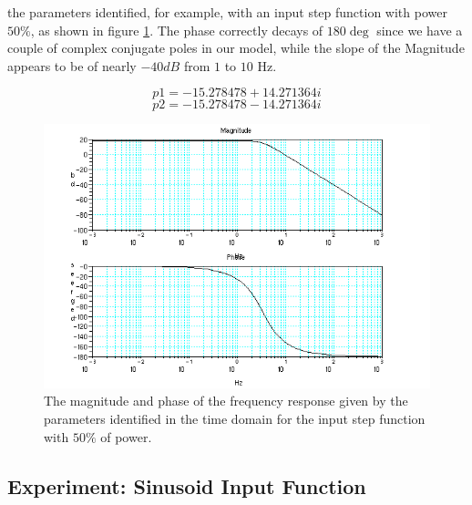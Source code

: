 the parameters identified, for example, with an input step function with power $50\%$, as shown in figure \ref{fig:bode_plot_sos}. The phase correctly decays of $180\deg$ since we have a couple of complex conjugate poles in our model, while the slope of the Magnitude appears to be of nearly $-40 dB$ from $1$ to $10$ Hz. 

\[
p1  = - 15.278478 + 14.271364i  
\]
\[
p2  = - 15.278478 - 14.271364i
\]

\begin{figure}[htbp]
\center
  \includegraphics[scale=0.65]{FIGURES_1/BODE_PLOT.png}
  \caption[Bode Plot]{The magnitude and phase of the frequency response given by the parameters identified in the time domain for the input step function with $50\%$ of power.}
  \label{fig:bode_plot_sos}
\end{figure}




\subsection{Experiment: Sinusoid Input Function}

